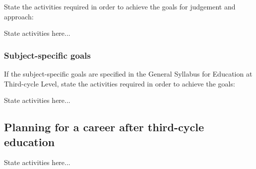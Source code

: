 State the activities required in order to achieve the goals for judgement and approach:

\colorbox{lgray}{
\begin{minipage}[t]{\textwidth}

State activities here...

\end{minipage}}

\subsubsection*{Subject-specific goals}
If the subject-specific goals are specified in the General Syllabus for Education at Third-cycle Level, state the activities required in order to achieve the goals:

\colorbox{lgray}{
\begin{minipage}[t]{\textwidth}

State activities here...

\end{minipage}}

\subsection{Planning for a career after third-cycle education}

\colorbox{lgray}{
\begin{minipage}[t]{\textwidth}

State activities here...

\end{minipage}}
\clearpage
